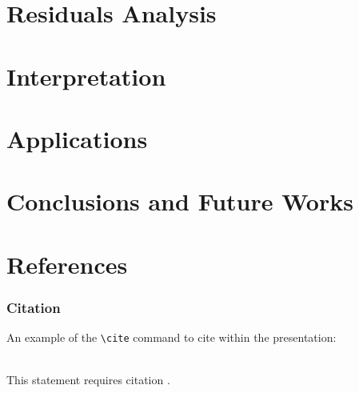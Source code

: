 \documentclass[aspectratio=169,xcolor=dvipsnames]{beamer}
\begin{document}

\section{Residuals Analysis}



\section{Interpretation}



\section{Applications}



\section{Conclusions and Future Works}



\section{References}



\begin{frame}[fragile] %
    \frametitle{Citation}
    An example of the \verb|\cite| command to cite within the presentation:\\~

    This statement requires citation \cite{p1}.
\end{frame}
\end{document}
